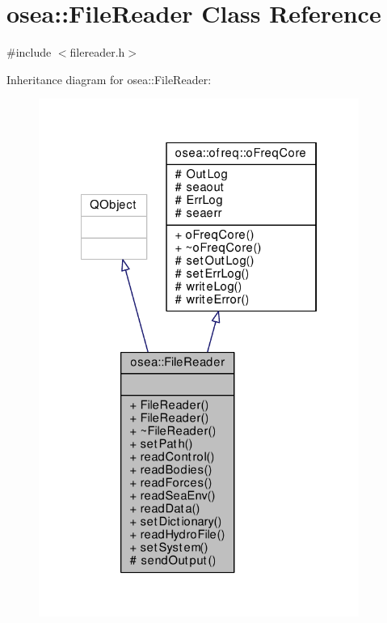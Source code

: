 \hypertarget{classosea_1_1_file_reader}{\section{osea\-:\-:File\-Reader Class Reference}
\label{classosea_1_1_file_reader}
}


{\ttfamily \#include $<$filereader.\-h$>$}



Inheritance diagram for osea\-:\-:File\-Reader\-:\nopagebreak
\begin{figure}[H]
\begin{center}
\leavevmode
\includegraphics[width=297pt]{classosea_1_1_file_reader__inherit__graph}
\end{center}
\end{figure}
